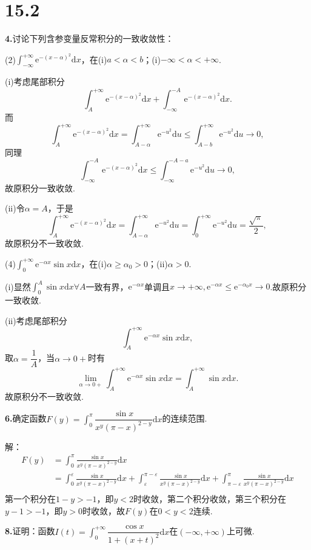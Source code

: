 \documentclass[12pt, a4paper]{article}
\newcommand{\e}{\mathrm{e}}
\newcommand{\dif}{\mathrm{d}}
\begin{document}
\section*{15.2}
\textbf{4.}讨论下列含参变量反常积分的一致收敛性：

(2)\(\int_{-\infty}^{+\infty} \e^{-(x - \alpha)^2}\dif x\)，在(i)\(a < \alpha < b\)；(i)\(-\infty < \alpha < +\infty\).

(i)考虑尾部积分
\[\int_{A}^{+\infty} \e^{-(x - \alpha)^2}\dif x + \int_{-\infty}^{-A} \e^{-(x - \alpha)^2}\dif x.\]
而
\[\int_{A}^{+\infty} \e^{-(x - \alpha)^2}\dif x = \int_{A - \alpha}^{+\infty} \e^{-u^2}\dif u \leq \int_{A - b}^{+\infty} \e^{-u^2}\dif u \to 0,\]
同理
\[\int_{-\infty}^{-A} \e^{-(x - \alpha)^2}\dif x \leq \int_{-\infty}^{-A - a} \e^{-u^2}\dif u \to 0,\]
故原积分一致收敛.

(ii)令\(\alpha = A\)，于是
\[\int_{A}^{+\infty} \e^{-(x - \alpha)^2}\dif x = \int_{A - \alpha}^{+\infty} \e^{-u^2}\dif u = \int_{0}^{+\infty} \e^{-u^2}\dif u = \frac{\sqrt{\pi}}{2},\]
故原积分不一致收敛.

(4)\(\int_{0}^{+\infty} \e^{-\alpha x}\sin x\dif x\)，在(i)\(\alpha \geq \alpha_0 > 0\)；(ii)\(\alpha > 0\).

(i)显然\(\int_0^A \sin x\dif x \forall A\)一致有界，\(\e^{-\alpha x}\)单调且\(x \to +\infty, \e^{-\alpha x} \leq \e^{-\alpha_0 x} \to 0\).故原积分一致收敛.

(ii)考虑尾部积分
\[\int_{A}^{+\infty} \e^{-\alpha x}\sin x\dif x,\]
取\(\alpha = \dfrac{1}{A}\)，当\(\alpha \to 0+\)时有
\[\lim_{\alpha \to 0+}\int_{A}^{+\infty} \e^{-\alpha x}\sin x\dif x = \int_{A}^{+\infty} \sin x\dif x.\]
故原积分不一致收敛.

\textbf{6.}确定函数\(F(y) = \int_{0}^{\pi} \dfrac{\sin x}{x^y(\pi - x)^{2 - y}}\dif x\)的连续范围.

解：
\begin{align*}
F(y) &= \int_{0}^{\pi} \frac{\sin x}{x^y(\pi - x)^{2 - y}}\dif x \\
&= \int_0^\varepsilon \frac{\sin x}{x^y(\pi - x)^{2 - y}}\dif x + \int_{\varepsilon}^{\pi - \varepsilon} \frac{\sin x}{x^y(\pi - x)^{2 - y}}\dif x + \int_{\pi - \varepsilon}^{\pi} \frac{\sin x}{x^y(\pi - x)^{2 - y}}\dif x \\
\end{align*}
第一个积分在\(1 - y > -1\)，即\(y < 2\)时收敛，第二个积分收敛，第三个积分在\(y - 1 > -1\)，即\(y > 0\)时收敛，故\(F(y)\)在\(0 < y < 2\)连续.

\textbf{8.}证明：函数\(I(t) = \int_{0}^{+\infty} \dfrac{\cos x}{1 + (x + t)^2}\dif x\)在\((-\infty, +\infty)\)上可微.
\end{document}
